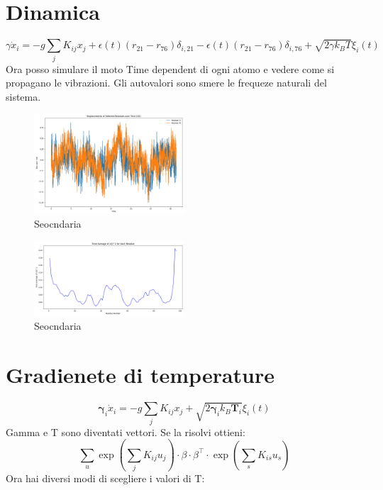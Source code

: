 \documentclass[Lau,binding=0.6cm,oneside,noexaminfo]{sapthesis}
\begin{document}
\section{Dinamica}
\begin{equation}
    \gamma \dot{x}_i = -g \sum_j K_{ij} x_j + \epsilon(t) (r_{21} - r_{76}) \delta_{i,21} - \epsilon(t) (r_{21} - r_{76}) \delta_{i,76} + \sqrt{2 \gamma k_B T} \xi_i(t)
    \end{equation}
Ora posso simulare il moto Time dependent di ogni atomo e vedere come si propagano le vibrazioni.
Gli autovalori sono smere le frequeze naturali del sistema.
\begin{figure}[H]
    \centering
    \includegraphics[width=0.5\textwidth]{"images/2m10_Processo_stocastico.png"}
    \caption{Seocndaria}
\end{figure}
\begin{figure}[H]
    \centering
    \includegraphics[width=0.5\textwidth]{"images/2m10_Stima beta factors.png"}
    \caption{Seocndaria}
\end{figure}
\section{Gradienete di temperature}
\begin{equation}
    \boldsymbol{\gamma}_i \dot{x}_i = -g \sum_j K_{ij} x_j  + \sqrt{2 \boldsymbol{\gamma}_i k_B \boldsymbol{T}_i} \xi_i(t)
    \end{equation}
Gamma e T sono diventati vettori.
Se la risolvi ottieni:
\begin{equation}
    \sum_{u} \exp\left( \sum_j K_{ij} u_j \right) \cdot \beta \cdot \beta^{\top} \cdot \exp\left( \sum_s K_{is} u_s \right)
    \end{equation}
Ora hai diversi modi di scegliere i valori di T:
\end{document}
